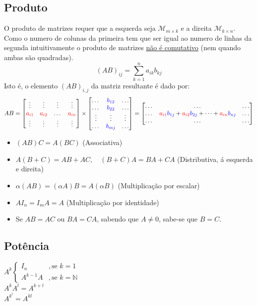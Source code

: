 \documentclass[]{report}
\begin{document}
\subsection{Produto}
O produto de matrizes requer que a esquerda seja $\mathcal{M}_{m\times k}$ e a direita $\mathcal{M}_{k\times n}$.\\
Como o numero de colunas da primeira tem que ser igual ao numero de linhas da segunda intuitivamente o produto de matrizes \underline{não é comutativo} (nem quando ambas são quadradas).
$$(AB)_{ij} = \sum^n_{k=1} a_{ik}b_{kj}$$
Isto é, o elemento $(AB)_{i,j}$ da matriz resultante é dado por:
$$AB = 
\begin{bmatrix}
\vdots & \vdots & \vdots & \vdots \\
\color{red}a_{i1} & \color{red}a_{i2} & \dots & \color{red}a_{in} \\
\vdots & \vdots & \vdots & \vdots
\end{bmatrix}
\times
\begin{bmatrix}
\dots & \color{blue}b_{12} & \dots \\
\dots & \color{blue}b_{22} & \dots\\
\vdots & \vdots & \vdots \\
\dots & \color{blue}b_{mj} & \dots
\end{bmatrix}
=
\begin{bmatrix}
\dots & \dots & \dots\\
\dots & \textcolor{red}{a_{i1}}\textcolor{blue}{b_{1j}} + \textcolor{red}{a_{i2}}\textcolor{blue}{b_{2j}} + \dots + \textcolor{red}{a_{in}}\textcolor{blue}{b_{nj}} & \dots\\
\dots & \dots & \dots
\end{bmatrix}$$
\begin{itemize}
\item $(AB)C = A(BC)$ (Associativa)
\item $A(B+C) = AB + AC, \quad (B+C)A = BA + CA$ (Distributiva, á esquerda e direita)
\item $\alpha(AB) = (\alpha A)B = A(\alpha B)$ (Multiplicação por escalar)
\item $AI_n = I_m A = A$ (Multiplicação por identidade)
\item Se $AB=AC$ ou $BA = CA$, sabendo que $A \neq 0$, sabe-se que $B=C$.
\end{itemize}
\subsection{Potência}
$A^k
\begin{cases}
I_n&,\text{se } k=1\\
A^{k-1}A&,\text{se } k=\mathbb{N}
\end{cases}
$\\
$A^k A^l = A^{k+l}$\\
$A^{k^l} = A^{kl}$
\end{document}

